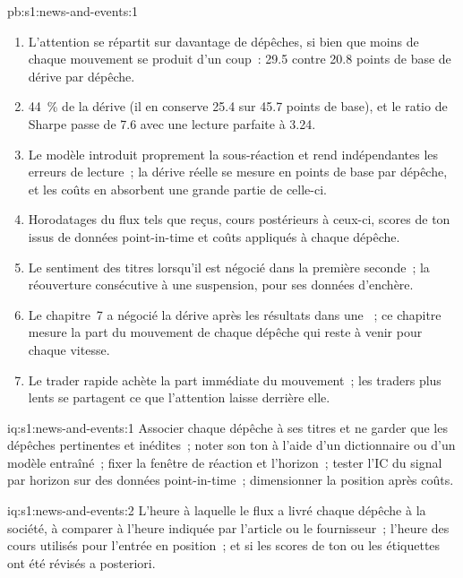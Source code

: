 \begin{solution}{pb:s1:news-and-events:1}
\begin{enumerate}
la clôture suivante~; un trader à horizon journalier, doté d'un modèle de texte imparfait, capte 25.4 points de base par dépêche, avec un ratio de Sharpe de 3.24 après coûts (1.80 les jours calmes,
2.74 les jours chargés).
\item L'attention se répartit sur davantage de dépêches, si bien que moins de chaque mouvement se produit d'un coup~: 29.5 contre 20.8 points de base de dérive par dépêche.
\item 44~\% de la dérive (il en conserve 25.4 sur 45.7 points de base), et le ratio de Sharpe passe de 7.6 avec une lecture parfaite à 3.24.
\item Le modèle introduit proprement la sous-réaction et rend indépendantes les erreurs de lecture~; la dérive réelle se mesure en points de base par dépêche, et les coûts en absorbent une grande partie
de celle-ci.
\item Horodatages du flux tels que reçus, cours postérieurs à ceux-ci, scores de ton issus de données point-in-time et coûts appliqués à chaque dépêche.
\item Le sentiment des titres lorsqu'il est négocié dans la première seconde~; la réouverture consécutive à une suspension, pour ses données d'enchère.
\item Le chapitre~7 a négocié la dérive après les résultats dans une ~; ce chapitre mesure la part du mouvement de chaque dépêche qui reste à venir pour chaque vitesse.
\item Le trader rapide achète la part immédiate du mouvement~; les traders plus lents se partagent ce que l'attention laisse derrière elle.
\end{enumerate}
\end{solution}

\begin{solution}{iq:s1:news-and-events:1}
Associer chaque dépêche à ses titres et ne garder que les dépêches pertinentes et inédites~; noter son ton à l'aide d'un dictionnaire ou d'un modèle entraîné~; fixer la fenêtre de réaction et
l'horizon~; tester l'IC du signal par horizon sur des données point-in-time~; dimensionner la position après coûts.
\end{solution}

\begin{solution}{iq:s1:news-and-events:2}
L'heure à laquelle le flux a livré chaque dépêche à la société, à comparer à l'heure indiquée par l'article ou le fournisseur~; l'heure des cours utilisés pour l'entrée en position~; et si
les scores de ton ou les étiquettes ont été révisés a posteriori.
\end{solution}

